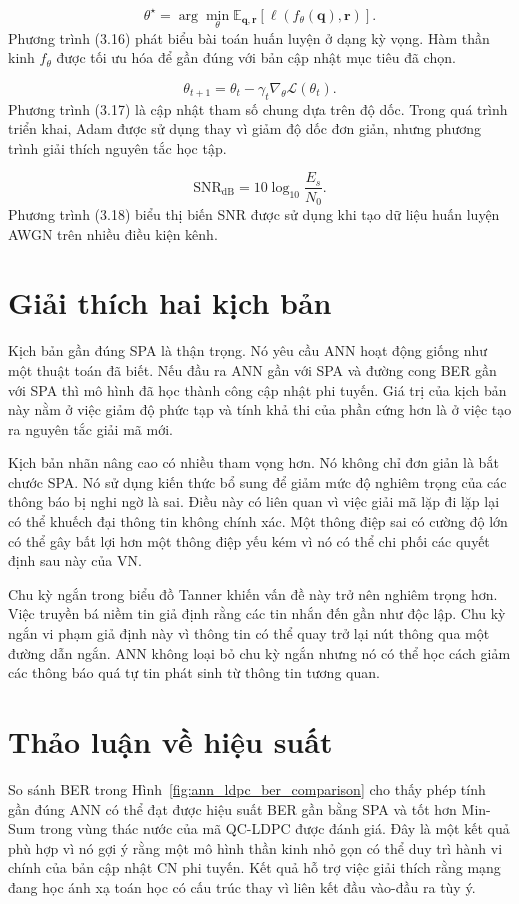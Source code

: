 \begin{equation}
\theta^{\star}=\arg\min_{\theta}\mathbb{E}_{\mathbf{q},\mathbf{r}}\left[\ell(f_{\theta}(\mathbf{q}),\mathbf{r})\right].
\end{equation}
Phương trình (3.16) phát biểu bài toán huấn luyện ở dạng kỳ vọng. Hàm thần kinh $f_\theta$ được tối ưu hóa để gần đúng với bản cập nhật mục tiêu đã chọn.

\begin{equation}
\theta_{t+1}=\theta_t-\gamma_t\nabla_{\theta}\mathcal{L}(\theta_t).
\end{equation}
Phương trình (3.17) là cập nhật tham số chung dựa trên độ dốc. Trong quá trình triển khai, Adam được sử dụng thay vì giảm độ dốc đơn giản, nhưng phương trình giải thích nguyên tắc học tập.

\begin{equation}
\mathrm{SNR}_{\mathrm{dB}}=10\log_{10}\frac{E_s}{N_0}.
\end{equation}
Phương trình (3.18) biểu thị biến SNR được sử dụng khi tạo dữ liệu huấn luyện AWGN trên nhiều điều kiện kênh.

\section{Giải thích hai kịch bản}
Kịch bản gần đúng SPA là thận trọng. Nó yêu cầu ANN hoạt động giống như một thuật toán đã biết. Nếu đầu ra ANN gần với SPA và đường cong BER gần với SPA thì mô hình đã học thành công cập nhật phi tuyến. Giá trị của kịch bản này nằm ở việc giảm độ phức tạp và tính khả thi của phần cứng hơn là ở việc tạo ra nguyên tắc giải mã mới.

Kịch bản nhãn nâng cao có nhiều tham vọng hơn. Nó không chỉ đơn giản là bắt chước SPA. Nó sử dụng kiến ​​thức bổ sung để giảm mức độ nghiêm trọng của các thông báo bị nghi ngờ là sai. Điều này có liên quan vì việc giải mã lặp đi lặp lại có thể khuếch đại thông tin không chính xác. Một thông điệp sai có cường độ lớn có thể gây bất lợi hơn một thông điệp yếu kém vì nó có thể chi phối các quyết định sau này của VN.

Chu kỳ ngắn trong biểu đồ Tanner khiến vấn đề này trở nên nghiêm trọng hơn. Việc truyền bá niềm tin giả định rằng các tin nhắn đến gần như độc lập. Chu kỳ ngắn vi phạm giả định này vì thông tin có thể quay trở lại nút thông qua một đường dẫn ngắn. ANN không loại bỏ chu kỳ ngắn nhưng nó có thể học cách giảm các thông báo quá tự tin phát sinh từ thông tin tương quan.

\section{Thảo luận về hiệu suất}
So sánh BER trong Hình~\ref{fig:ann_ldpc_ber_comparison} cho thấy phép tính gần đúng ANN có thể đạt được hiệu suất BER gần bằng SPA và tốt hơn Min-Sum trong vùng thác nước của mã QC-LDPC được đánh giá. Đây là một kết quả phù hợp vì nó gợi ý rằng một mô hình thần kinh nhỏ gọn có thể duy trì hành vi chính của bản cập nhật CN phi tuyến. Kết quả hỗ trợ việc giải thích rằng mạng đang học ánh xạ toán học có cấu trúc thay vì liên kết đầu vào-đầu ra tùy ý.

